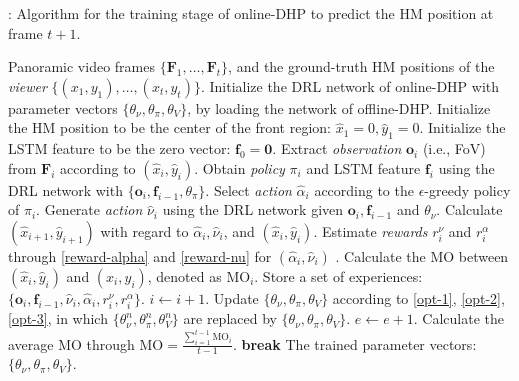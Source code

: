 \documentclass[10pt,journal,compsoc]{IEEEtran}
\begin{document}
\begin{algorithm}
   \caption{\hspace{-.3em}: Algorithm for the training stage of online-DHP to predict the HM position at frame $t+1$.}
   \label{online-DHP-algorithm-training}
   \footnotesize
\begin{algorithmic}[1]
    Panoramic video frames $\{\mathbf{F}_1, \ldots, \mathbf{F}_t \}$, and the ground-truth HM positions of the \textit{viewer} $\{(x_{1},y_{1}),\ldots, (x_{t},y_{t})\}$.
   \STATE Initialize the DRL network of online-DHP with parameter vectors $\{ \theta_{{\nu}}, \theta_{{\pi}}, \theta_{V} \}$, by loading the network of offline-DHP.
       \STATE Initialize the HM position to be the center of the front region: $\hat{x}_1=0,\hat{y}_1=0$.
       \STATE Initialize the LSTM feature to be the zero vector: $\mathbf{f}_0=\mathbf{0}$.
           \STATE Extract \textit{observation} $\mathbf{o}_i$ (i.e., FoV) from $\mathbf{F}_i$ according to $(\hat{x}_{i},\hat{y}_{i})$.
           \STATE Obtain \textit{policy} $\pi_{i}$ and LSTM feature $\mathbf{f}_{i}$ using the DRL network with $\{\mathbf{o}_i, \mathbf{f}_{i-1}, \theta_{\pi}\}$.
           \STATE Select \textit{action} $\hat{\alpha}_{i}$ according to the $\epsilon$-greedy policy of $\pi_{i}$.
           \STATE Generate \textit{action} $\hat{\nu}_{i}$ using the DRL network given $\mathbf{o}_{i}, \mathbf{f}_{i-1}$ and $ \theta_{\nu}$.
           \STATE Calculate $(\hat{x}_{i+1}, \hat{y}_{i+1})$ with regard to $\hat{\alpha}_{i},\hat{\nu}_{i}$, and $(\hat{x}_{i}, \hat{y}_{i})$.
           \STATE Estimate \textit{rewards} $r^{\nu}_{i}$ and $ r^{\alpha}_{i}$ through \eqref{reward-alpha} and \eqref{reward-nu} for $(\hat{\alpha}_{i},\hat{\nu}_{i})$ .
           \STATE Calculate the MO between $(\hat{x}_{i},\hat{y}_{i})$ and $(x_{i},y_{i})$, denoted as $\text{MO}_i$.
           \STATE Store a set of experiences: $\{ \mathbf{o}_{i}, \! \mathbf{f}_{i-1},\! \hat{\nu}_{i},\! \hat{\alpha}_{i},\! r^{\nu}_{i},\! r^{\alpha}_{i} \}$.
           \STATE $i \leftarrow i+1$.
       \ENDFOR
       \STATE Update $\{ \theta_{\nu}, \theta_{\pi}, \theta_{V} \}$ according to \eqref{opt-1}, \eqref{opt-2}, \eqref{opt-3}, in which $\{ \theta^{n}_{\nu}, \theta^{n}_{\pi}, \theta^{n}_{V} \}$ are replaced by $\{ \theta_{\nu}, \theta_{\pi}, \theta_{V} \}$.
       \STATE $e \leftarrow e+1$.
       \STATE Calculate the average MO through $\text{MO} =  \frac{\sum_{i=1}^{t-1} \text{MO}_{i}}{t-1}$.
           \STATE \textbf{break}
       \ENDIF
  \ENDFOR
   The trained parameter vectors: $\{ \theta_{\nu}, \theta_{\pi}, \theta_{V} \}$.
\end{algorithmic}
\end{algorithm}
\vspace{-1em}
\end{document}
